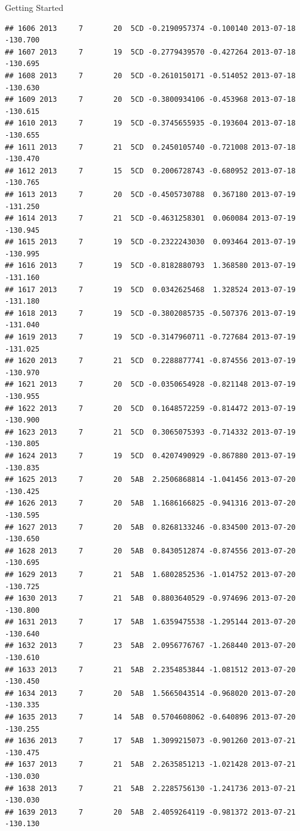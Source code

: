 \documentclass[
  ignorenonframetext,
]{beamer}
\begin{document}
\begin{frame}[fragile]{Getting Started}
\begin{verbatim}
## 1606 2013     7       20  5CD -0.2190957374 -0.100140 2013-07-18 -130.700
## 1607 2013     7       19  5CD -0.2779439570 -0.427264 2013-07-18 -130.695
## 1608 2013     7       20  5CD -0.2610150171 -0.514052 2013-07-18 -130.630
## 1609 2013     7       20  5CD -0.3800934106 -0.453968 2013-07-18 -130.615
## 1610 2013     7       19  5CD -0.3745655935 -0.193604 2013-07-18 -130.655
## 1611 2013     7       21  5CD  0.2450105740 -0.721008 2013-07-18 -130.470
## 1612 2013     7       15  5CD  0.2006728743 -0.680952 2013-07-18 -130.765
## 1613 2013     7       20  5CD -0.4505730788  0.367180 2013-07-19 -131.250
## 1614 2013     7       21  5CD -0.4631258301  0.060084 2013-07-19 -130.945
## 1615 2013     7       19  5CD -0.2322243030  0.093464 2013-07-19 -130.995
## 1616 2013     7       19  5CD -0.8182880793  1.368580 2013-07-19 -131.160
## 1617 2013     7       19  5CD  0.0342625468  1.328524 2013-07-19 -131.180
## 1618 2013     7       19  5CD -0.3802085735 -0.507376 2013-07-19 -131.040
## 1619 2013     7       19  5CD -0.3147960711 -0.727684 2013-07-19 -131.025
## 1620 2013     7       21  5CD  0.2288877741 -0.874556 2013-07-19 -130.970
## 1621 2013     7       20  5CD -0.0350654928 -0.821148 2013-07-19 -130.955
## 1622 2013     7       20  5CD  0.1648572259 -0.814472 2013-07-19 -130.900
## 1623 2013     7       21  5CD  0.3065075393 -0.714332 2013-07-19 -130.805
## 1624 2013     7       19  5CD  0.4207490929 -0.867880 2013-07-19 -130.835
## 1625 2013     7       20  5AB  2.2506868814 -1.041456 2013-07-20 -130.425
## 1626 2013     7       20  5AB  1.1686166825 -0.941316 2013-07-20 -130.595
## 1627 2013     7       20  5AB  0.8268133246 -0.834500 2013-07-20 -130.650
## 1628 2013     7       20  5AB  0.8430512874 -0.874556 2013-07-20 -130.695
## 1629 2013     7       21  5AB  1.6802852536 -1.014752 2013-07-20 -130.725
## 1630 2013     7       21  5AB  0.8803640529 -0.974696 2013-07-20 -130.800
## 1631 2013     7       17  5AB  1.6359475538 -1.295144 2013-07-20 -130.640
## 1632 2013     7       23  5AB  2.0956776767 -1.268440 2013-07-20 -130.610
## 1633 2013     7       21  5AB  2.2354853844 -1.081512 2013-07-20 -130.450
## 1634 2013     7       20  5AB  1.5665043514 -0.968020 2013-07-20 -130.335
## 1635 2013     7       14  5AB  0.5704608062 -0.640896 2013-07-20 -130.255
## 1636 2013     7       17  5AB  1.3099215073 -0.901260 2013-07-21 -130.475
## 1637 2013     7       21  5AB  2.2635851213 -1.021428 2013-07-21 -130.030
## 1638 2013     7       21  5AB  2.2285756130 -1.241736 2013-07-21 -130.030
## 1639 2013     7       20  5AB  2.4059264119 -0.981372 2013-07-21 -130.130

\end{verbatim}
\end{frame}
\end{document}

